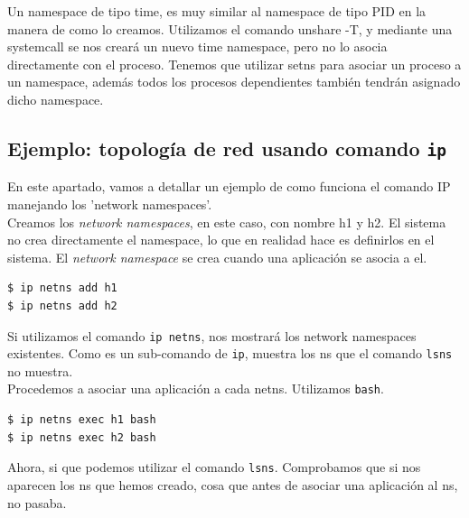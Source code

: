 \documentclass[12pt]{article}
\begin{document}
	\par \noindent Un namespace de tipo time, es muy similar al namespace de tipo PID en la manera de como lo creamos. Utilizamos el comando unshare -T, y mediante una systemcall se nos creará un nuevo time namespace, pero no lo asocia directamente con el proceso. Tenemos que utilizar setns para asociar un proceso a un namespace, además todos los procesos dependientes también tendrán asignado dicho namespace. 
	
	\addvspace{80px}
	
	
	\pagebreak
	
	\subsection{Ejemplo: topología de red usando comando \texttt{ip}}
	\noindent En este apartado, vamos a detallar un ejemplo de como funciona el comando IP manejando los 'network namespaces'.\\
	
	\noindent Creamos los \textit{network namespaces}, en este caso, con nombre h1 y h2. El sistema no crea directamente el namespace, lo que en realidad hace es definirlos en el sistema. El \textit{network namespace} se crea cuando una aplicación se asocia a el.
	\begin{verbatim}
$ ip netns add h1
$ ip netns add h2
	\end{verbatim}

	\noindent Si utilizamos el comando \texttt{ip netns}, nos mostrará los network namespaces existentes. Como es un sub-comando de \texttt{ip}, muestra los ns que el comando \texttt{lsns} no muestra. \\
	
	\noindent Procedemos a asociar una aplicación a cada netns. Utilizamos \texttt{bash}.
	\begin{verbatim}
$ ip netns exec h1 bash
$ ip netns exec h2 bash
	\end{verbatim}

	\noindent Ahora, si que podemos utilizar el comando \texttt{lsns}. Comprobamos que si nos aparecen los ns que hemos creado, cosa que antes de asociar una aplicación al ns, no pasaba. \\
	
\end{document}
